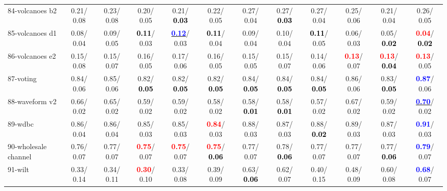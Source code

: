 \begin{table}[h]
\begin{center}
{\begin{tabular}{lc|c|c|c|c|c|c|c|c|c|c}
84-volcanoes b2 &   0.21/  0.08 &   0.23/  0.08 &   0.20/  0.05 &   0.21/\textcolor{black}{\textbf{  0.03}} &   0.22/  0.05 &   0.27/  0.04 &   0.27/\textcolor{black}{\textbf{  0.03}} &   0.27/  0.04 &   0.25/  0.06 &   0.21/  0.04 &   0.26/  0.05 \\
85-volcanoes d1 &   0.08/  0.04 &   0.09/  0.05 & \textcolor{black}{\textbf{  0.11}}/  0.03 & \underline{\textcolor{blue}{\textbf{  0.12}}}/  0.03 & \textcolor{black}{\textbf{  0.11}}/  0.04 &   0.09/  0.04 &   0.10/  0.04 & \textcolor{black}{\textbf{  0.11}}/  0.05 &   0.06/  0.03 &   0.05/\textcolor{black}{\textbf{  0.02}} & \textcolor{red}{\textbf{  0.04}}/\textcolor{black}{\textbf{  0.02}} \\ \hline
86-volcanoes e2 &   0.15/  0.08 &   0.15/  0.07 &   0.16/  0.05 &   0.17/  0.06 &   0.16/  0.05 &   0.15/  0.05 &   0.15/  0.07 &   0.14/  0.06 & \textcolor{red}{\textbf{  0.13}}/  0.07 & \textcolor{red}{\textbf{  0.13}}/\textcolor{black}{\textbf{  0.04}} & \textcolor{red}{\textbf{  0.13}}/  0.05 \\
87-voting &   0.84/  0.06 &   0.85/  0.06 &   0.82/\textcolor{black}{\textbf{  0.05}} &   0.82/\textcolor{black}{\textbf{  0.05}} &   0.82/\textcolor{black}{\textbf{  0.05}} &   0.84/\textcolor{black}{\textbf{  0.05}} &   0.84/\textcolor{black}{\textbf{  0.05}} &   0.84/\textcolor{black}{\textbf{  0.05}} &   0.86/  0.06 &   0.83/\textcolor{black}{\textbf{  0.05}} & \textcolor{blue}{\textbf{  0.87}}/  0.06 \\
88-waveform v2 &   0.66/  0.02 &   0.65/  0.02 &   0.59/  0.02 &   0.59/  0.02 &   0.58/  0.02 &   0.58/\textcolor{black}{\textbf{  0.01}} &   0.58/\textcolor{black}{\textbf{  0.01}} &   0.57/  0.02 &   0.67/  0.02 &   0.59/  0.02 & \underline{\textcolor{blue}{\textbf{  0.70}}}/  0.02 \\
89-wdbc &   0.86/  0.04 &   0.86/  0.04 &   0.85/  0.03 &   0.85/  0.03 & \textcolor{red}{\textbf{  0.84}}/  0.03 &   0.88/  0.03 &   0.87/  0.03 &   0.88/\textcolor{black}{\textbf{  0.02}} &   0.89/  0.03 &   0.87/  0.03 & \textcolor{blue}{\textbf{  0.91}}/  0.03 \\
90-wholesale channel &   0.76/  0.07 &   0.77/  0.07 & \textcolor{red}{\textbf{  0.75}}/  0.07 & \textcolor{red}{\textbf{  0.75}}/  0.07 & \textcolor{red}{\textbf{  0.75}}/\textcolor{black}{\textbf{  0.06}} &   0.77/  0.07 &   0.78/\textcolor{black}{\textbf{  0.06}} &   0.77/  0.07 &   0.77/  0.07 &   0.77/\textcolor{black}{\textbf{  0.06}} & \textcolor{blue}{\textbf{  0.79}}/  0.07 \\
91-wilt &   0.33/  0.14 &   0.34/  0.11 & \textcolor{red}{\textbf{  0.30}}/  0.10 &   0.33/  0.08 &   0.39/  0.09 &   0.63/\textcolor{black}{\textbf{  0.06}} &   0.62/  0.07 &   0.40/  0.15 &   0.48/  0.09 &   0.60/  0.08 & \textcolor{blue}{\textbf{  0.68}}/  0.07 \\

\end{tabular}}
\end{center}
\end{table}

